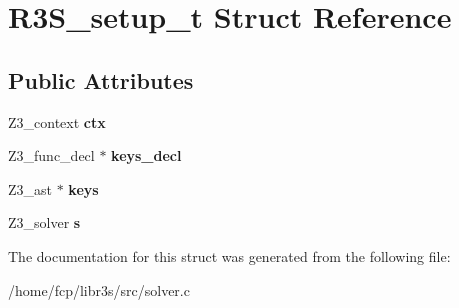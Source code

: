 \hypertarget{structR3S__setup__t}{}\section{R3\+S\+\_\+setup\+\_\+t Struct Reference}
\label{structR3S__setup__t}
\subsection*{Public Attributes}
\begin{DoxyCompactItemize}
\item 
\mbox{\label{structR3S__setup__t_adbf12216d3576bc3c2680a1c7a9422f0}} 
Z3\+\_\+context {\bfseries ctx}
\item 
\mbox{\label{structR3S__setup__t_a4bced277f2e3aa9ece60f962b89cc144}} 
Z3\+\_\+func\+\_\+decl $\ast$ {\bfseries keys\+\_\+decl}
\item 
\mbox{\label{structR3S__setup__t_ae73d8536717962cb7e1b207d6cead57b}} 
Z3\+\_\+ast $\ast$ {\bfseries keys}
\item 
\mbox{\label{structR3S__setup__t_a390b3c014767e28480eafd90aed8abe1}} 
Z3\+\_\+solver {\bfseries s}
\end{DoxyCompactItemize}


The documentation for this struct was generated from the following file\+:\begin{DoxyCompactItemize}
\item 
/home/fcp/libr3s/src/solver.\+c\end{DoxyCompactItemize}
